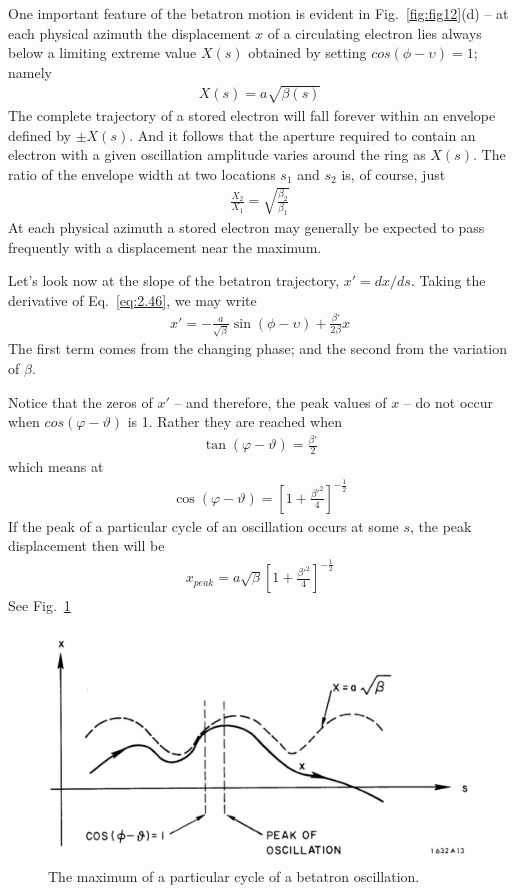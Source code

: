 One important feature of the betatron motion is evident in Fig.~\ref{fig:fig12}(d) -- at each physical azimuth the displacement $x$ of a circulating electron lies always below a limiting extreme value $X(s)$ obtained by setting $cos(\phi - \upsilon) = 1$; namely
\begin{align}
	X(s) = a\sqrt{\beta(s)}
\end{align}
The complete trajectory of a stored electron will fall forever within an envelope defined by $\pm X(s)$. And it follows that the aperture required to contain an electron with a given oscillation amplitude varies around the ring as $X(s)$. The ratio of the envelope width at two locations $s_1$ and $s_2$ is, of course, just
\begin{align}
	\frac{X_2}{X_1} = \sqrt{\frac{\beta_2}{\beta_1}}
\end{align}
At each physical azimuth a stored electron may generally be expected to pass frequently with a displacement near the maximum.

Let's look now at the slope of the betatron trajectory, $x' = dx/ds$. Taking the derivative of Eq.~\eqref{eq:2.46}, we may write
\begin{align}
	x' = - \frac{a}{\sqrt{\beta}}\sin(\phi-\upsilon)+\frac{\beta'}{2\beta}x\label{eq:2.52}
\end{align}
The first term comes from the changing phase; and the second from the variation of $\beta$.

Notice that the zeros of $x'$ -- and therefore, the peak values of $x$ -- do not occur when $cos(\varphi - \vartheta)$ is 1. Rather they are reached when
\begin{align}
	\tan(\varphi-\vartheta) = \frac{\beta'}{2}
\end{align}
which means at
\begin{align}
	\cos(\varphi-\vartheta) = \left[1+\frac{\beta'^2}{4}\right]^{-\frac{1}{2}}
\end{align}
If the peak of a particular cycle of an oscillation occurs at some $s$, the peak displacement then will be
\begin{align}
	x_{peak} = a\sqrt{\beta}\left[1+\frac{\beta'^2}{4}\right]^{-\frac{1}{2}}
\end{align}
See Fig.~\ref{fig:fig13}

\begin{figure}[!htb]
	\centering
	\includegraphics[width=0.8\linewidth]{./Figuras/fig13.jpeg}
	\caption{The maximum of a particular cycle of a betatron oscillation.}
	\label{fig:fig13}
\end{figure}

